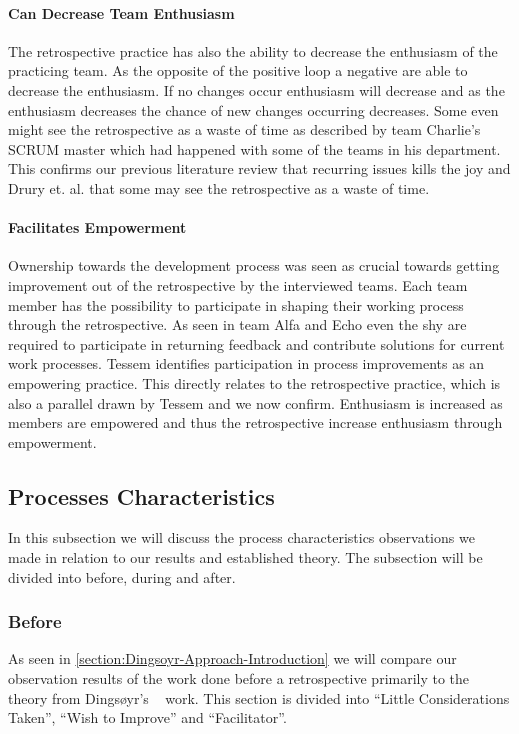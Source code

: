 \paragraph{Can Decrease Team Enthusiasm}
The retrospective practice has also the ability to decrease the enthusiasm of the practicing team. As the opposite of the positive loop a negative are able to decrease the enthusiasm. If no changes occur enthusiasm will decrease and as the enthusiasm decreases the chance of new changes occurring decreases. Some even might see the retrospective as a waste of time as described by team Charlie's SCRUM master which had happened with some of the teams in his department. This confirms our previous literature review \cite{Dolvik2014} that recurring issues kills the joy and Drury et. al. \cite{Drury2012} that some may see the retrospective as a waste of time. 

\paragraph{Facilitates Empowerment}
Ownership towards the development process was seen as crucial towards getting improvement out of the retrospective by the interviewed teams. Each team member has the possibility to participate in shaping their working process through the retrospective. As seen in team Alfa and Echo even the shy are required to participate in returning feedback and contribute solutions for current work processes. Tessem \cite{Tessem2014} identifies participation in process improvements as an empowering practice. This directly relates to the retrospective practice, which is also a parallel drawn by Tessem and we now confirm. Enthusiasm is increased as members are empowered\cite{Tessem2014} and thus the retrospective increase enthusiasm through empowerment. 

\subsection{Processes Characteristics}
In this subsection we will discuss the process characteristics observations we made in relation to our results and established theory. The subsection will be divided into before, during and after.

\subsubsection{Before}
As seen in \autoref{section:Dingsoyr-Approach-Introduction} we will compare our observation results of the work done before a retrospective primarily to the theory from Dingsøyr's ~\cite{Dingsoyr2004} work. This section is divided into ``Little Considerations Taken'', ``Wish to Improve'' and ``Facilitator''.

